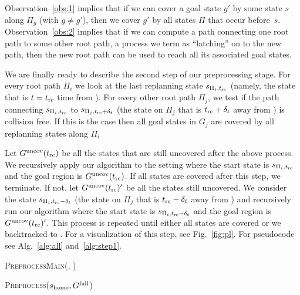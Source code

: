 \documentclass[conference]{IEEEtran}
\begin{document}
%
Observation~\ref{obs:1} implies that if we can cover a goal state $g'$  by some state $s$ along $\Pi_g$ (with $g \neq g'$), then we cover $g'$ by all states $\Pi$ that occur before~$s$.
%
Observation~\ref{obs:2} implies that if we can compute a path connecting one root path to some other root path, a process we term as ``latching'' on to the new path, then the new root path can be used to reach all its associated goal states.

We are finally ready to describe the second step of our preprocessing stage.
%
For every root path $\Pi_i$ we look at the last replanning state $s_{\Pi_i, t_{\textrm{rc}}}$ (namely, the state that is $t=t_{\textrm{rc}}$ time from \Shome). For every other root path $\Pi_j$, we test if the path connecting $s_{\Pi_i, t_{\textrm{rc}}}$ to $s_{\Pi_j, t_{\textrm{rc}} + \delta_t}$ (the state on $\Pi_j$ that is $t_{\textrm{rc}}+\delta_t$ away from \Shome) is collision free. 
%
If this is the case then all goal states in $G_j$ are covered by all replanning states along $\Pi_i$
%

Let $G^{\textrm{uncov}}(t_{\textrm{rc}})$ be all the states that are still uncovered after the above process. We recursively apply our algorithm to the setting where the start state is $s_{\Pi_i, t_{\textrm{rc}}}$ and the goal region is $G^{\textrm{uncov}}(t_{\textrm{rc}})$.
If all states are covered after this step, we terminate. 
If not, let $G^{\textrm{uncov}}(t_{\textrm{rc}})'$ be all the states still uncovered.
We consider the state $s_{\Pi_i, t_{\textrm{rc}}-\delta_t}$ (the state on $\Pi_j$ that is $t_{\textrm{rc}}-\delta_t$ away from \Shome) and recursively run our algorithm where the start state is $s_{\Pi_i, t_{\textrm{rc}}-\delta_t}$ and the goal region is $G^{\textrm{uncov}}(t_{\textrm{rc}})'$.
This process is repeated until either all states are covered or we backtracked to \Shome.
For a visualization of this step, see Fig.~\ref{fig:pl}.
For pseudocode see Alg.~\ref{alg:all} and~\ref{alg:step1}.

\begin{algorithm}
\caption{\textsc{PreprocessMain(\Shome, \Gfull)}}\label{alg:all}
\begin{algorithmic}[1]
\State \textsc{Preprocess}($s_{\textrm{home}}, G^{\textrm{full}}$)
\end{algorithmic}
\end{algorithm}
\end{document}
